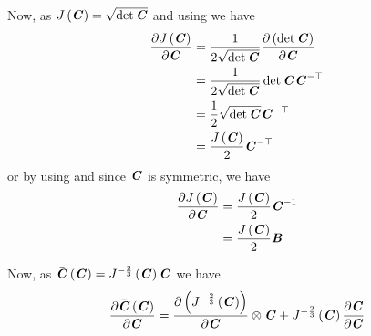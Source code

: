 Now, as $ J\left( \boldsymbol{\mathit{C}} \right) =\sqrt{\det \boldsymbol{\mathit{C}}}$ and using
 we have
\begin{equation}
  \begin{split}
     \dfrac{\partial  J\left( \boldsymbol{\mathit{C}} \right) }{\partial \boldsymbol{\mathit{C}}} &=\dfrac{1}{2\sqrt{\det \boldsymbol{\mathit{C}}}} \dfrac{\partial \left( \det \boldsymbol{\mathit{C}} \right)}{\partial \boldsymbol{\mathit{C}}} \\
    &=\dfrac{1}{2\sqrt{\det \boldsymbol{\mathit{C}}}}\det \boldsymbol{\mathit{C}} {\boldsymbol{\mathit{C}}}^{- \top } \\
    &=\dfrac{1}{2}\sqrt{\det \boldsymbol{\mathit{C}}} {\boldsymbol{\mathit{C}}}^{- \top } \\
    &=\dfrac{ J\left( \boldsymbol{\mathit{C}} \right) }{2} {\boldsymbol{\mathit{C}}}^{- \top } 
  \end{split}
\end{equation}
or by using  and since
$\boldsymbol{\mathit{C}}$ is symmetric, we have
\begin{equation}
  \begin{split}
    \delby{\fnof{J}{\tensortwo{C}}}{\tensortwo{C}}&=\dfrac{\fnof{J}{\tensortwo{C}}}{2}\inverse{\tensortwo{C}}\\
    &=\dfrac{\fnof{J}{\tensortwo{C}}}{2}\tensortwo{B}
  \end{split}
  \label{eqn:DelJacobianDelC}
\end{equation}

Now, as
$ \bar{\boldsymbol{\mathit{C}}}\left( \boldsymbol{\mathit{C}} \right) = J^{-\frac{2}{3}}\left( \boldsymbol{\mathit{C}} \right) \boldsymbol{\mathit{C}}$
we have
\begin{equation}
  \delby{\fnof{\bar{\tensortwo{C}}}{\tensortwo{C}}}{\tensortwo{C}}=\tensorprod{\delby{\pbrac{\fnof{J^{-\frac{2}{3}}}{\tensortwo{C}}}}{\tensortwo{C}}}{\tensortwo{C}}+\fnof{J^{-\frac{2}{3}}}{\tensortwo{C}}\delby{\tensortwo{C}}{\tensortwo{C}}
  \label{eqn:DelCBarDelCFirst}
\end{equation}


